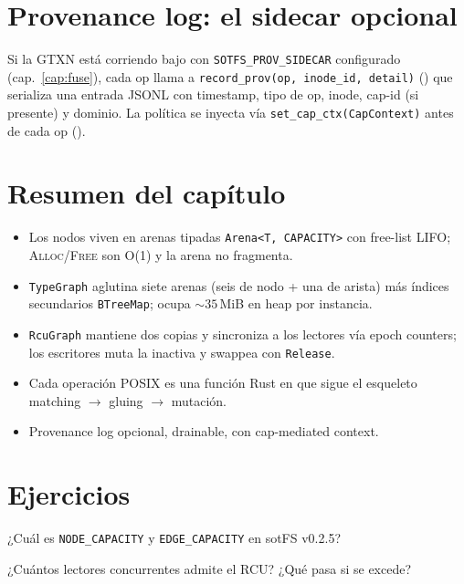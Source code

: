 \section{Provenance log: el sidecar opcional}

Si la GTXN está corriendo bajo \fuse{} con
\texttt{SOTFS\_PROV\_SIDECAR} configurado
(cap.~\ref{cap:fuse}), cada op llama a
\texttt{record\_prov(op, inode\_id, detail)}
() que serializa una entrada
JSONL con timestamp, tipo de op, inode, cap-id (si presente) y dominio.
La política se inyecta vía \texttt{set\_cap\_ctx(CapContext)} antes de
cada op ().

\section*{Resumen del capítulo}

\begin{itemize}
  \item Los nodos viven en arenas tipadas \texttt{Arena<T,
    CAPACITY>} con free-list LIFO; \textsc{Alloc}/\textsc{Free} son
    O(1) y la arena no fragmenta.
  \item \texttt{TypeGraph} aglutina siete arenas (seis de nodo + una de
    arista) más índices secundarios \texttt{BTreeMap}; ocupa
    $\sim 35$\,MiB en heap por instancia.
  \item \texttt{RcuGraph} mantiene dos copias y sincroniza a los
    lectores vía epoch counters; los escritores muta la inactiva y
    swappea con \texttt{Release}.
  \item Cada operación POSIX es una función Rust en 
    que sigue el esqueleto matching $\to$ gluing $\to$ mutación.
  \item Provenance log opcional, drainable, con cap-mediated context.
\end{itemize}

\section*{Ejercicios}

\begin{ejercicio}[\dificultad{$\star$}]
\label{ej:impl-1}
¿Cuál es \texttt{NODE\_CAPACITY} y \texttt{EDGE\_CAPACITY} en sotFS
v0.2.5?
\end{ejercicio}

\begin{ejercicio}[\dificultad{$\star$}]
\label{ej:impl-2}
¿Cuántos lectores concurrentes admite el RCU? ¿Qué pasa si se excede?
\end{ejercicio}

